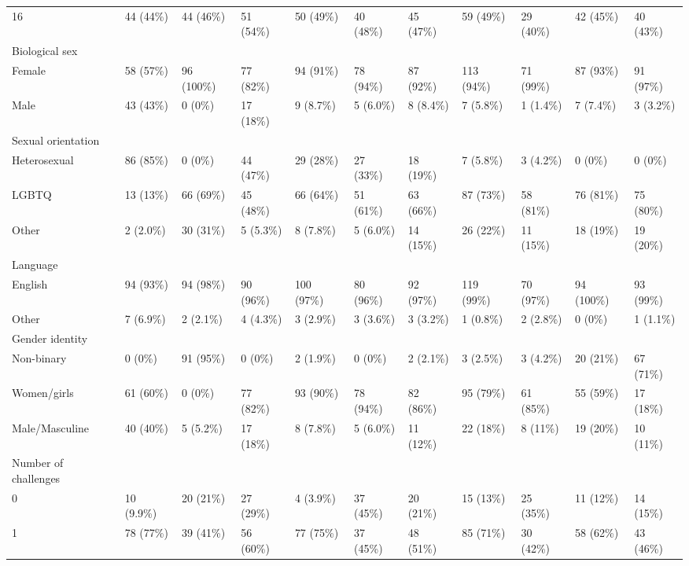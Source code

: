 \begin{table}[ht]
\begin{tabular}{lllllllllll}
  16 & 44 (44\%) & 44 (46\%) & 51 (54\%) & 50 (49\%) & 40 (48\%) & 45 (47\%) & 59 (49\%) & 29 (40\%) & 42 (45\%) & 40 (43\%) \\ 
  Biological sex &  &  &  &  &  &  &  &  &  &  \\ 
  Female & 58 (57\%) & 96 (100\%) & 77 (82\%) & 94 (91\%) & 78 (94\%) & 87 (92\%) & 113 (94\%) & 71 (99\%) & 87 (93\%) & 91 (97\%) \\ 
  Male & 43 (43\%) & 0 (0\%) & 17 (18\%) & 9 (8.7\%) & 5 (6.0\%) & 8 (8.4\%) & 7 (5.8\%) & 1 (1.4\%) & 7 (7.4\%) & 3 (3.2\%) \\ 
  Sexual orientation &  &  &  &  &  &  &  &  &  &  \\ 
  Heterosexual & 86 (85\%) & 0 (0\%) & 44 (47\%) & 29 (28\%) & 27 (33\%) & 18 (19\%) & 7 (5.8\%) & 3 (4.2\%) & 0 (0\%) & 0 (0\%) \\ 
  LGBTQ & 13 (13\%) & 66 (69\%) & 45 (48\%) & 66 (64\%) & 51 (61\%) & 63 (66\%) & 87 (73\%) & 58 (81\%) & 76 (81\%) & 75 (80\%) \\ 
  Other & 2 (2.0\%) & 30 (31\%) & 5 (5.3\%) & 8 (7.8\%) & 5 (6.0\%) & 14 (15\%) & 26 (22\%) & 11 (15\%) & 18 (19\%) & 19 (20\%) \\ 
  Language &  &  &  &  &  &  &  &  &  &  \\ 
  English & 94 (93\%) & 94 (98\%) & 90 (96\%) & 100 (97\%) & 80 (96\%) & 92 (97\%) & 119 (99\%) & 70 (97\%) & 94 (100\%) & 93 (99\%) \\ 
  Other & 7 (6.9\%) & 2 (2.1\%) & 4 (4.3\%) & 3 (2.9\%) & 3 (3.6\%) & 3 (3.2\%) & 1 (0.8\%) & 2 (2.8\%) & 0 (0\%) & 1 (1.1\%) \\ 
  Gender identity &  &  &  &  &  &  &  &  &  &  \\ 
  Non-binary & 0 (0\%) & 91 (95\%) & 0 (0\%) & 2 (1.9\%) & 0 (0\%) & 2 (2.1\%) & 3 (2.5\%) & 3 (4.2\%) & 20 (21\%) & 67 (71\%) \\ 
  Women/girls & 61 (60\%) & 0 (0\%) & 77 (82\%) & 93 (90\%) & 78 (94\%) & 82 (86\%) & 95 (79\%) & 61 (85\%) & 55 (59\%) & 17 (18\%) \\ 
  Male/Masculine & 40 (40\%) & 5 (5.2\%) & 17 (18\%) & 8 (7.8\%) & 5 (6.0\%) & 11 (12\%) & 22 (18\%) & 8 (11\%) & 19 (20\%) & 10 (11\%) \\ 
  Number of challenges &  &  &  &  &  &  &  &  &  &  \\ 
  0 & 10 (9.9\%) & 20 (21\%) & 27 (29\%) & 4 (3.9\%) & 37 (45\%) & 20 (21\%) & 15 (13\%) & 25 (35\%) & 11 (12\%) & 14 (15\%) \\ 
  1 & 78 (77\%) & 39 (41\%) & 56 (60\%) & 77 (75\%) & 37 (45\%) & 48 (51\%) & 85 (71\%) & 30 (42\%) & 58 (62\%) & 43 (46\%) \\ 

\end{tabular}
\end{table}

